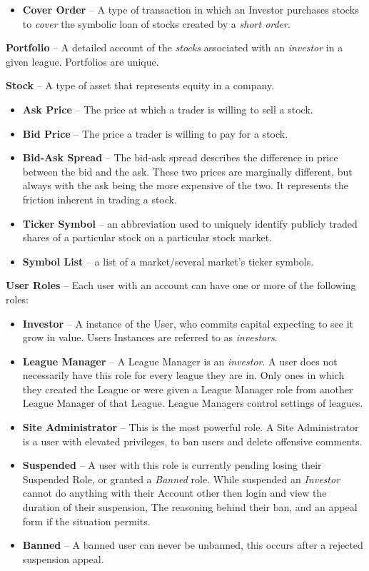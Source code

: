 {\begin{itemize}
\begin{itemize}
		a certain number of stocks (using their existing Margin) and sells them at market price,
		expecting the stock value to decrease and to make a profit when exiting the position. 
		Exiting is called a \emph{cover}. \cite{inv:short}
	\item \textbf{Cover Order} -- A type of transaction in which an Investor purchases stocks to 
		\emph{cover} the symbolic loan of stocks created by a \emph{short order}. \cite{inv:cover}
	\end{itemize}
\end{itemize}
\textbf{Portfolio} -- A detailed account of the \emph{stocks} associated with an \emph{investor} 
in a given league. Portfolios are unique. 

\textbf{Stock} -- A type of asset that represents equity in a company.
\begin{itemize}
\item \textbf{Ask Price} -- The price at which a trader is willing to sell a stock.
\item \textbf{Bid Price} -- The price a trader is willing to pay for a stock.
\item \textbf{Bid-Ask Spread} -- The bid-ask spread describes the difference in price between the bid and the ask. These two prices are marginally different, but always with the ask being the more expensive of the two. It represents the friction inherent in trading a stock. \cite{inv:bidask}
\item \textbf{Ticker Symbol} -- an abbreviation used to uniquely identify publicly traded shares of a particular stock on a particular stock market.
\item \textbf{Symbol List} -- a list of a market/several market's ticker symbols.
\end{itemize}
\textbf{User Roles} -- Each user with an account can have one or more of the following roles:
\begin{itemize}
\item \textbf{Investor} -- A instance of the User, who commits capital expecting to see it grow in value. Users Instances are referred 
to as \emph{investors}. 
\item \textbf{League Manager} -- A League Manager is an \emph{investor}.  A user does not necessarily have this role for every league they are in.  Only ones in which they created the League or were given a League Manager role from another League Manager of that League. League Managers control settings of leagues.
\item \textbf{Site Administrator} -- This is the most powerful role. A Site Administrator is a user with elevated privileges, to ban users and delete offensive comments.
\item \textbf{Suspended} -- A user with this role is currently pending losing their Suspended Role, or granted a \emph{Banned} role.  While suspended an \emph{Investor} cannot do anything with their Account other then login and view the duration of their suspension, The reasoning behind their ban, and an appeal form if the situation permits.
\item \textbf{Banned} -- A banned user can never be unbanned, this occurs after a rejected suspension appeal.
\end{itemize}
}